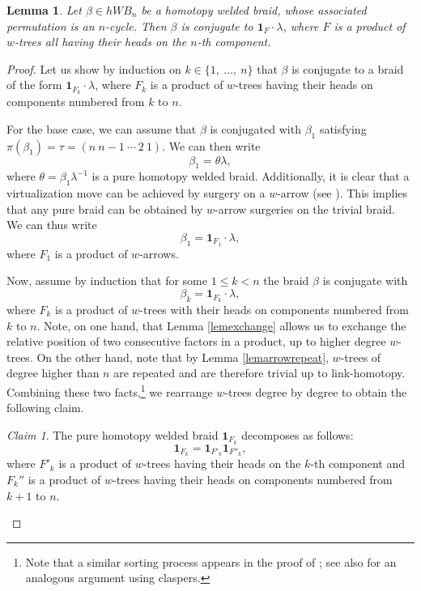 \documentclass[11pt, a4paper, twoside,reqno]{amsart}
\theoremstyle{plain}
\newtheorem{lem}[thm]{Lemma}
\theoremstyle{definition}
\theoremstyle{remark}
\newtheorem{claim}[thm]{Claim}
\begin{document}
\begin{lem}\label{lemtorsionweldedniceform}
Let $\beta\in hWB_n$ be a homotopy welded braid, whose associated permutation is an $n$-cycle. Then $\beta$ is conjugate to $\mathbf 1_{F}\cdot\lambda$, where $F$ is a product of $w$-trees all having their heads on the $n$-th component.
\end{lem}
\begin{proof}
Let us show by induction on $k\in\{1,\ \ldots,\ n\}$ that $\beta$ is conjugate to a braid of the form $\mathbf1_{F_k}\cdot\lambda$, where $F_k$ is a product of $w$-trees having their heads on components numbered from $k$ to $n$.

For the base case, we can assume that $\beta$ is conjugated with $\beta_1$ satisfying $\pi(\beta_1)=\tau=(n\ n-1\ \cdots\ 2\ 1)$. We can then write $$\beta_1=\theta\lambda,$$ where $\theta=\beta_1\lambda^{-1}$ is a pure homotopy welded braid. Additionally, it is clear that a virtualization move can be achieved by surgery on a $w$-arrow (see \cite[Fig. 6]{JBYasuArrowcalc}). This implies that any pure braid can be obtained by $w$-arrow surgeries on the trivial braid. We can thus write
$$\beta_1=\mathbf1_{F_1}\cdot\lambda,$$
where $F_1$ is a product of $w$-arrows.

Now, assume by induction that for some $1\leq k<n$ the braid $\beta$ is conjugate with $$\beta_k=\mathbf1_{F_k}\cdot\lambda,$$
where $F_k$ is a product of $w$-trees with their heads on components numbered from $k$ to $n$.
Note, on one hand, that Lemma \ref{lemexchange} allows us to exchange the relative position of two consecutive factors in a product, up to higher degree $w$-trees. On the other hand, note that by Lemma \ref{lemarrowrepeat}, $w$-trees of degree higher than $n$ are repeated and are therefore trivial up to link-homotopy. Combining these two facts,\footnote{Note that a similar sorting process appears in the proof of \cite[Thm. 9.4]{JBYasuArrowcalc}; see also \cite[Thm. 4.3]{YasuharaAkiraSelfdelteq} for an analogous argument using claspers.} we rearrange $w$-trees degree by degree to obtain the following claim.
\begin{claim}\label{claimarrowdecompo}
The pure homotopy welded braid $\mathbf1_{F_k}$ decomposes as follows:
$$\mathbf1_{F_k}=\mathbf1_{F'_k}\mathbf1_{F''_k},$$ where $F'_k$ is a product of $w$-trees having their heads on the $k$-th component and $F_k''$ is a product of $w$-trees having their heads on components numbered from $k+1$ to $n$.
\end{claim}


\end{proof}
\end{document}
